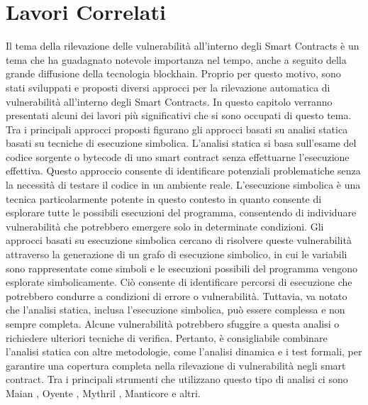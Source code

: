 \documentclass[../../Thesis.tex]{subfiles}
\begin{document}
\chapter{Lavori Correlati}
\label{ch:relatedwork}
Il tema della rilevazione delle vulnerabilità all'interno degli Smart Contracts è un tema che ha guadagnato notevole importanza nel tempo, anche a seguito della grande diffusione della tecnologia blockhain. Proprio per questo motivo, sono stati sviluppati e proposti diversi approcci per la rilevazione automatica di vulnerabilità all'interno degli Smart Contracts. In questo capitolo verranno presentati alcuni dei lavori più significativi che si sono occupati di questo tema.
Tra i principali approcci proposti figurano gli approcci basati su analisi statica basati su tecniche di esecuzione simbolica. L'analisi statica si basa sull'esame del codice sorgente o bytecode di uno smart contract senza effettuarne l'esecuzione effettiva. Questo approccio consente di identificare potenziali problematiche senza la necessità di testare il codice in un ambiente reale. L'esecuzione simbolica è una tecnica particolarmente potente in questo contesto in quanto consente di esplorare tutte le possibili esecuzioni del programma, consentendo di individuare vulnerabilità che potrebbero emergere solo in determinate condizioni.
Gli approcci basati su esecuzione simbolica cercano di risolvere queste vulnerabilità attraverso la generazione di un grafo di esecuzione simbolico, in cui le variabili sono rappresentate come simboli e le esecuzioni possibili del programma vengono esplorate simbolicamente. Ciò consente di identificare percorsi di esecuzione che potrebbero condurre a condizioni di errore o vulnerabilità.
Tuttavia, va notato che l'analisi statica, inclusa l'esecuzione simbolica, può essere complessa e non sempre completa. Alcune vulnerabilità potrebbero sfuggire a questa analisi o richiedere ulteriori tecniche di verifica. Pertanto, è consigliabile combinare l'analisi statica con altre metodologie, come l'analisi dinamica e i test formali, per garantire una copertura completa nella rilevazione di vulnerabilità negli smart contract. Tra i principali strumenti che utilizzano questo tipo di analisi ci sono Maian \cite{Maian, Maian2}, Oyente \cite{Oyente, Oyente2}, Mythril \cite{Mythril}, Manticore \cite{Manticore} e altri.
\end{document}
